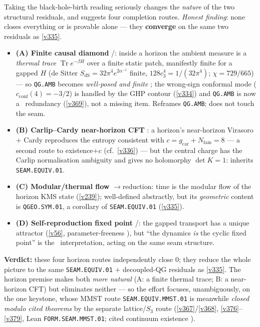 \documentclass[11pt,a4paper]{article}
\newcommand{\cthree}{c_3}
\newcommand{\gcar}{g_{\mathrm{car}}}
\newcommand{\Nfam}{N_{\mathrm{fam}}}
\newcommand{\ainv}{\alpha^{-1}}
\begin{document}
\begin{keybox}
Taking the black-hole-birth reading seriously changes the \emph{nature} of the two structural residuals, and
suggests four completion routes. \emph{Honest finding}: none closes everything or is provable alone --- they
\textbf{converge} on the same two residuals as \vref{v335}.
\begin{itemize}\setlength\itemsep{1pt}
\item \textbf{(A) Finite causal diamond} \mE/\mO: inside a horizon the ambient measure is a \emph{thermal trace}
$\operatorname{Tr}e^{-\beta H}$ over a finite static patch, manifestly finite for a gapped $H$ (de Sitter
$S_{\mathrm{dS}}=32\pi^4 e^{2\ainv}$ finite, $128\cthree^4=1/(32\pi^4)$; $\chi=729/665$) --- so \texttt{QG.AMB}
becomes \emph{well-posed and finite} \mE; the wrong-sign conformal mode ($c_{\mathrm{conf}}(4)=-3/2$) is handled by
the GHP contour (\vref{v334}) and \texttt{QG.AMB} is now a \mC\ redundancy (\vref{v369}), not a missing item.
Reframes \texttt{QG.AMB}; does not touch the seam.
\item \textbf{(B) Carlip--Cardy near-horizon CFT} \mC: a horizon's near-horizon Virasoro $+$ Cardy reproduces the
entropy consistent with $c=\gcar{+}\Nfam=8$ --- a second route to existence$+c$ (cf.\ \vref{v336}) --- but the
central charge has the Carlip normalisation ambiguity and gives no holomorphy $\det K{=}1$: inherits
\texttt{SEAM.EQUIV.01}.
\item \textbf{(C) Modular/thermal flow} \mE$\to$reduction: time is the modular flow of the horizon KMS state
(\vref{v239}); well-defined abstractly, but its \emph{geometric} content is \texttt{QGEO.SYM.01}, a corollary of
\texttt{SEAM.EQUIV.01} (\vref{v335}).
\item \textbf{(D) Self-reproduction fixed point} \mE/\mO: the gapped transport has a unique attractor (\vref{v56},
parameter-freeness \mE), but ``the dynamics \emph{is} the cyclic fixed point'' is the \mC\ interpretation, acting
on the same seam structure.
\end{itemize}
\textbf{Verdict:} these four horizon routes independently close $0$; they reduce the whole picture to the same
\texttt{SEAM.EQUIV.01} $+$ decoupled-QG residuals as \vref{v335}. The horizon premise makes both \emph{more
natural} (A: a finite thermal trace; B: a near-horizon CFT) but eliminates neither --- so the effort focuses,
unambiguously, on the one keystone, whose MMST route \texttt{SEAM.EQUIV.MMST.01} is meanwhile \emph{closed modulo
cited theorems} by the separate
lattice/$S_3$ route (\vref{v367}/\vref{v368}, \vref{v376}--\vref{v379}, Lean \texttt{FORM.SEAM.MMST.01}; cited
continuum existence \mO).
\end{keybox}
\end{document}
